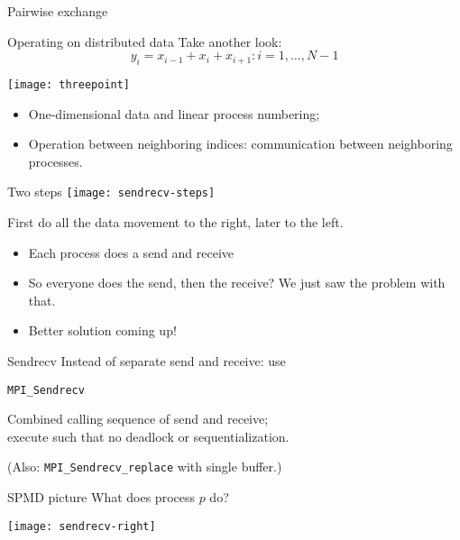 
 {Pairwise exchange}

\begin{numberedframe}{Operating on distributed data}
Take another look: \[ y_i=x_{i-1}+x_i+x_{i+1}\colon i=1,\ldots,N-1 \]

\texttt{[image: threepoint]}

\begin{itemize}
\item One-dimensional data and linear process numbering;
\item Operation between neighboring indices: communication between
  neighboring processes.
\end{itemize}
\end{numberedframe}

\begin{numberedframe}{Two steps}
  \texttt{[image: sendrecv-steps]}

  First do all the data movement to the right, later to the left.
  \begin{itemize}
  \item Each process does a send and receive
  \item So everyone does the send, then the receive? We just saw the
    problem with that.
  \item Better solution coming up!
  \end{itemize}
\end{numberedframe}

\begin{numberedframe}{Sendrecv}
  Instead of separate send and receive: use

  \lstinline{MPI_Sendrecv}

  Combined calling sequence of send and receive;\\
  execute such that no deadlock or sequentialization.

  (Also: \lstinline{MPI_Sendrecv_replace}
  with single buffer.)
\end{numberedframe}


\begin{numberedframe}{SPMD picture}
  What does process $p$ do?
  
  \texttt{[image: sendrecv-right]}
\end{numberedframe}

